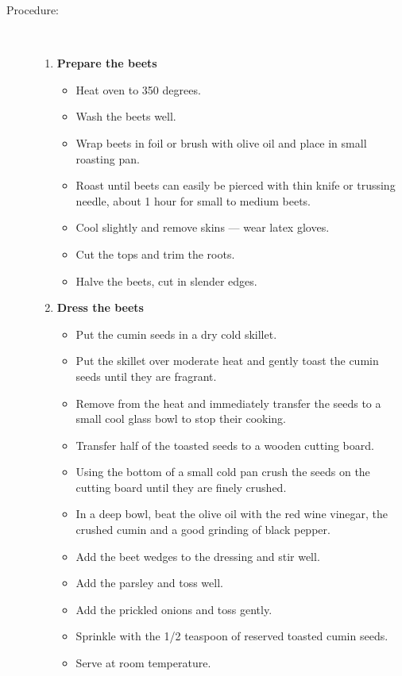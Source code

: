 \documentclass[11pt,letterpaper]{article}
\begin{document}
\begin{description}
\item[Procedure:]\ \\
	\begin{enumerate}
	\item {\bf Prepare the beets}
	\begin{itemize}
	\item Heat oven to 350 degrees. 
	\item Wash the beets well.
	\item Wrap beets in foil or brush with olive oil and place in small roasting pan. 
	\item Roast until beets can easily be pierced with thin knife or trussing needle, about 1 hour for small to medium beets. 
	\item Cool slightly and remove skins --- wear latex gloves.
	\item Cut the tops and trim the roots.
	\item Halve the beets, cut in slender edges.
	\end{itemize}
	\item {\bf Dress the beets}
	\begin{itemize}
	\item Put the cumin seeds in a dry cold skillet.
	\item Put the skillet over moderate heat and gently toast the cumin seeds until they are fragrant.
	\item Remove from the heat and immediately transfer the seeds to a small cool glass bowl to stop their cooking.
	\item Transfer half of the toasted seeds to a wooden cutting board.
	\item Using the bottom of a small cold pan crush the seeds on the cutting board until they are finely crushed.
	\item In a deep bowl, beat the olive oil with the red wine vinegar, the crushed cumin and a good grinding of black pepper.
	\item Add the beet wedges to the dressing and stir well.
	\item Add the parsley and toss well.
	\item Add the prickled onions and toss gently.
	\item Sprinkle with the 1/2 teaspoon of reserved toasted cumin seeds.
	\item Serve at room temperature.
	\end{itemize}
	\end{enumerate}
\end{description}
\end{document}
